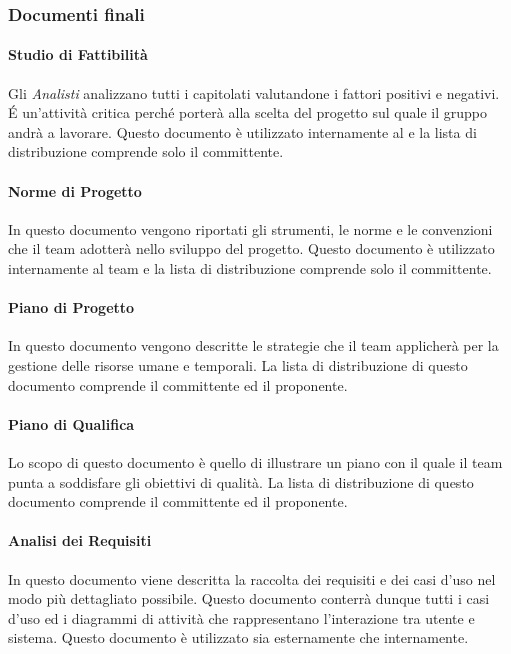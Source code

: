 \subsubsection{Documenti finali}

\paragraph{Studio di Fattibilità } 
Gli \emph{Analisti} analizzano tutti i capitolati valutandone
i fattori positivi e negativi. \'E un'attività critica perché porterà alla scelta del 
progetto sul quale il gruppo andrà a lavorare.  Questo
documento è utilizzato internamente al  e la lista di
distribuzione comprende solo il committente. 

\paragraph{Norme di Progetto }

In questo documento vengono riportati gli strumenti, le norme e le
convenzioni che il team adotterà nello sviluppo del progetto. Questo
documento è utilizzato internamente al team e la lista di
distribuzione comprende solo il committente. 

\paragraph{Piano di Progetto }

In questo documento vengono descritte le strategie che il team
applicherà per la gestione delle risorse umane e temporali. La lista
di distribuzione di questo documento comprende il committente ed il
proponente. 

\paragraph{Piano di Qualifica }

Lo scopo di questo documento è quello di illustrare un piano con il
quale  il team punta a soddisfare gli obiettivi di qualità.  La lista
di distribuzione di questo documento comprende il committente ed il
proponente. 

\paragraph{Analisi dei Requisiti }

In questo documento viene descritta la raccolta dei requisiti e dei
casi d’uso nel modo più dettagliato possibile. Questo documento
conterrà dunque tutti i casi d’uso ed
i diagrammi di attività che rappresentano l’interazione 
tra utente e sistema. Questo documento è utilizzato sia
esternamente che internamente. 



